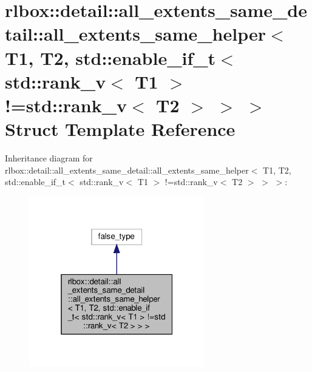 \hypertarget{structrlbox_1_1detail_1_1all__extents__same__detail_1_1all__extents__same__helper_3_01T1_00_01T2fa3c3927c8e078fa88e073dc4dc89b0a}{}\section{rlbox\+:\+:detail\+:\+:all\+\_\+extents\+\_\+same\+\_\+detail\+:\+:all\+\_\+extents\+\_\+same\+\_\+helper$<$ T1, T2, std\+:\+:enable\+\_\+if\+\_\+t$<$ std\+:\+:rank\+\_\+v$<$ T1 $>$ !=std\+:\+:rank\+\_\+v$<$ T2 $>$ $>$ $>$ Struct Template Reference}
\label{structrlbox_1_1detail_1_1all__extents__same__detail_1_1all__extents__same__helper_3_01T1_00_01T2fa3c3927c8e078fa88e073dc4dc89b0a}


Inheritance diagram for rlbox\+:\+:detail\+:\+:all\+\_\+extents\+\_\+same\+\_\+detail\+:\+:all\+\_\+extents\+\_\+same\+\_\+helper$<$ T1, T2, std\+:\+:enable\+\_\+if\+\_\+t$<$ std\+:\+:rank\+\_\+v$<$ T1 $>$ !=std\+:\+:rank\+\_\+v$<$ T2 $>$ $>$ $>$\+:\nopagebreak
\begin{figure}[H]
\begin{center}
\leavevmode
\includegraphics[width=217pt]{structrlbox_1_1detail_1_1all__extents__same__detail_1_1all__extents__same__helper_3_01T1_00_01T22d742f67eff51496871ec1e617d028bb}
\end{center}
\end{figure}


